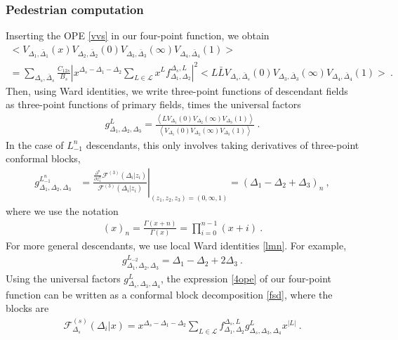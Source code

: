 \documentclass[12pt, a4paper, notitlepage, twoside]{report}
\numberwithin{equation}{section}
\theoremstyle{break}
\begin{document}
\subsubsection{Pedestrian computation}

Inserting the OPE \eqref{vvs} in our four-point function, we obtain
\begin{multline}
 \Big< V_{\Delta_1,\bar\Delta_1}(x) V_{\Delta_2,\bar\Delta_2}(0)V_{\Delta_3,\bar\Delta_3}(\infty)V_{\Delta_4,\bar\Delta_4}(1)\Big>
 \\
 = 
 \sum_{\Delta_s,\bar\Delta_s} \frac{C_{12s}}{B_s} 
 \left| x^{\Delta_s-\Delta_1-\Delta_2}\sum_{L\in\mathcal{L}} x^Lf^{\Delta_s,L}_{\Delta_1,\Delta_2} \right|^2
 \Big< L\bar L V_{\Delta_s,\bar\Delta_s}(0) V_{\Delta_3,\bar\Delta_3}(\infty) V_{\Delta_4,\bar\Delta_4}(1) \Big>\ .
 \label{4ope}
\end{multline}
Then, using Ward identities, we write three-point functions of descendant fields as three-point functions of primary fields, times the universal factors
\begin{align}
g^{L}_{\Delta_1,\Delta_2,\Delta_3} = 
 \frac{ \left< L V_{\Delta_1}(0)V_{\Delta_2}(\infty)V_{\Delta_3}(1)\right> }{  \left<  V_{\Delta_1}(0)V_{\Delta_2}(\infty)V_{\Delta_3}(1)\right>}\ .
 \label{glvv}
\end{align}
In the case of $L_{-1}^n$ descendants, this only involves taking derivatives of three-point conformal blocks, 
\begin{align}
 g^{L_{-1}^n}_{\Delta_1,\Delta_2,\Delta_3} & =\left. \frac{\frac{\partial^n}{\partial z_1^n} \mathcal{F}^{(3)}(\Delta_i|z_i)}{\mathcal{F}^{(3)}(\Delta_i|z_i)}\right|_{(z_1,z_2,z_3)=(0,\infty,1)} =(\Delta_1-\Delta_2+\Delta_3)_n \ ,
 \label{gln}
\end{align}
where we use the notation
\begin{align}
 (x)_n = \frac{\Gamma(x+n)}{\Gamma(x)} = \prod_{i=0}^{n-1}(x+i)\ .
\label{xn}
\end{align}
For more general descendants, we use local Ward identities \eqref{lmn}. For example,
\begin{align}
 g^{L_{-2}}_{\Delta_1,\Delta_2,\Delta_3}
 = \Delta_1-\Delta_2+2\Delta_3\ .
 \label{glt}
\end{align}
Using the universal factors $g^L_{\Delta_s,\Delta_3,\Delta_4}$, the expression \eqref{4ope} of our four-point function can be written as a conformal block decomposition \eqref{fsd}, where the blocks are 
\begin{align}
 \mathcal{F}^{(s)}_{\Delta_s}(\Delta_i|x) = x^{\Delta_s-\Delta_1-\Delta_2}\sum_{L\in\mathcal{L}} f_{\Delta_1,\Delta_2}^{\Delta_s,L} g^{L}_{\Delta_s,\Delta_3,\Delta_4}x^{|L|}\ .
\label{gsd}
\end{align}
\end{document}
